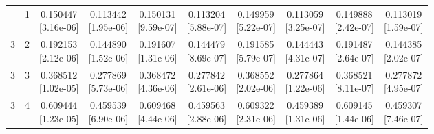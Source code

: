 \documentclass[12pt,letterpaper]{article}
\theoremstyle{plain}
\theoremstyle{definition}
\begin{document}
\begin{table}[p]
\begin{adjustbox}{max width=\linewidth}
\begin{tabular}{@{}rr*{8}{c}@{}}
\addlinespace[2pt]
3 & 1 & \shortstack{0.150447\\[-1pt]{\scriptsize[3.16e-06]}} & \shortstack{0.113442\\[-1pt]{\scriptsize[1.95e-06]}} & \shortstack{0.150131\\[-1pt]{\scriptsize[9.59e-07]}} & \shortstack{0.113204\\[-1pt]{\scriptsize[5.88e-07]}} & \shortstack{0.149959\\[-1pt]{\scriptsize[5.22e-07]}} & \shortstack{0.113059\\[-1pt]{\scriptsize[3.25e-07]}} & \shortstack{0.149888\\[-1pt]{\scriptsize[2.42e-07]}} & \shortstack{0.113019\\[-1pt]{\scriptsize[1.59e-07]}}\\
3 & 2 & \shortstack{0.192153\\[-1pt]{\scriptsize[2.12e-06]}} & \shortstack{0.144890\\[-1pt]{\scriptsize[1.52e-06]}} & \shortstack{0.191607\\[-1pt]{\scriptsize[1.31e-06]}} & \shortstack{0.144479\\[-1pt]{\scriptsize[8.69e-07]}} & \shortstack{0.191585\\[-1pt]{\scriptsize[5.79e-07]}} & \shortstack{0.144443\\[-1pt]{\scriptsize[4.31e-07]}} & \shortstack{0.191487\\[-1pt]{\scriptsize[2.64e-07]}} & \shortstack{0.144385\\[-1pt]{\scriptsize[2.02e-07]}}\\
3 & 3 & \shortstack{0.368512\\[-1pt]{\scriptsize[1.02e-05]}} & \shortstack{0.277869\\[-1pt]{\scriptsize[5.73e-06]}} & \shortstack{0.368472\\[-1pt]{\scriptsize[4.36e-06]}} & \shortstack{0.277842\\[-1pt]{\scriptsize[2.61e-06]}} & \shortstack{0.368552\\[-1pt]{\scriptsize[2.02e-06]}} & \shortstack{0.277864\\[-1pt]{\scriptsize[1.22e-06]}} & \shortstack{0.368521\\[-1pt]{\scriptsize[8.11e-07]}} & \shortstack{0.277872\\[-1pt]{\scriptsize[4.95e-07]}}\\
3 & 4 & \shortstack{0.609444\\[-1pt]{\scriptsize[1.23e-05]}} & \shortstack{0.459539\\[-1pt]{\scriptsize[6.90e-06]}} & \shortstack{0.609468\\[-1pt]{\scriptsize[4.44e-06]}} & \shortstack{0.459563\\[-1pt]{\scriptsize[2.88e-06]}} & \shortstack{0.609322\\[-1pt]{\scriptsize[2.31e-06]}} & \shortstack{0.459389\\[-1pt]{\scriptsize[1.31e-06]}} & \shortstack{0.609145\\[-1pt]{\scriptsize[1.44e-06]}} & \shortstack{0.459307\\[-1pt]{\scriptsize[7.46e-07]}}\\

\end{tabular}
\end{adjustbox}
\end{table}
\end{document}
